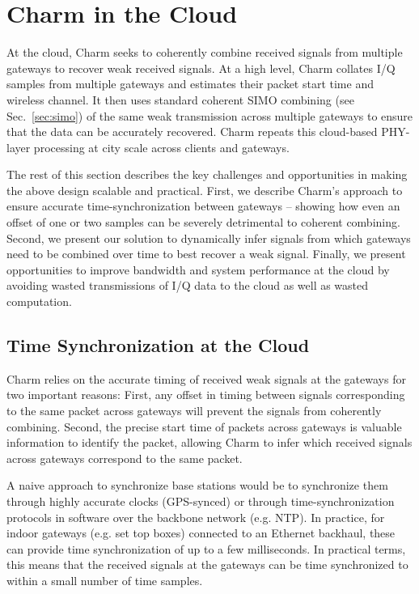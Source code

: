\section{Charm in the Cloud}
\label{sec:cloud}

At the cloud, Charm seeks to coherently combine received signals from multiple
gateways to recover weak received signals. At a high level, Charm collates I/Q
samples from multiple gateways and estimates their packet start time and
wireless channel. It then uses standard coherent SIMO combining (see
Sec.~\ref{sec:simo}) of the same weak transmission across multiple gateways to
ensure that the data can be accurately recovered. Charm repeats this
cloud-based PHY-layer processing at city scale across clients and gateways.

The rest of this section describes the key challenges and opportunities in
making the above design scalable and practical. First, we describe Charm's
approach to ensure accurate time-synchronization between gateways -- showing
how even an offset of one or two samples can be severely detrimental to
coherent combining. Second, we present our solution to dynamically infer
signals from which gateways need to be combined over time to best recover a
weak signal. Finally, we present opportunities to improve bandwidth and system
performance at the cloud by avoiding wasted transmissions of I/Q data to the
cloud as well as wasted computation.

\subsection{Time Synchronization at the Cloud}
Charm relies on the accurate timing of received weak signals at the gateways
for two important reasons: First, any offset in timing between signals
corresponding to the same packet across  gateways will prevent the signals
from coherently combining. Second, the precise start time of packets across
gateways is valuable information to identify the packet, allowing Charm to
infer which received signals across gateways correspond to the same packet.

A naive approach to synchronize base stations would be to synchronize them
through highly accurate clocks (GPS-synced) or through time-synchronization
protocols in software over the backbone network (e.g. NTP). In practice, for
indoor gateways (e.g. set top boxes) connected to an Ethernet backhaul, these
can provide time synchronization of up to a few milliseconds. In practical
terms, this means that the received signals at the gateways can be time
synchronized to within a small number of time samples.

